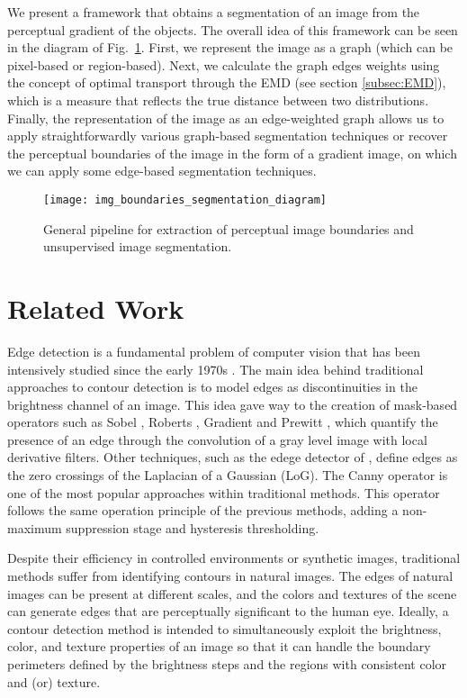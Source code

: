 We present a framework that obtains a segmentation of an image from the perceptual gradient of the objects. The overall idea of this framework can be seen in the diagram of Fig.\ \ref{fig:pipeline_gabor_image_segmentation}. First, we represent the image as a graph (which can be pixel-based or region-based). Next, we calculate the graph edges weights using the concept of optimal transport through the EMD (see section \ref{subsec:EMD}), which is a measure that reflects the true distance between two distributions. Finally, the representation of the image as an edge-weighted graph allows us to apply straightforwardly various graph-based segmentation techniques or recover the perceptual boundaries of the image in the form of a gradient image, on which we can apply some edge-based segmentation techniques. 

\begin{figure}[!ht]
	\centering
	\texttt{[image: img\_boundaries\_segmentation\_diagram]}
	\caption{General pipeline for extraction of perceptual image boundaries and unsupervised image segmentation.}\label{fig:pipeline_gabor_image_segmentation}
\end{figure}

\section{Related Work}\label{sec:soa_boundaries_segmentation} \label{sec:SoA_segmentation_methods}
Edge detection is a fundamental problem of computer vision that has been intensively studied since the early 1970s \citep{Hueckel:JACM:1971, Fram.Deutsch:TC:1975}. The main idea behind traditional approaches to contour detection is to model edges as discontinuities in the brightness channel of an image. This idea gave way to the creation of mask-based operators such as Sobel \citep{Sobel.Feldman:SAIL:1990}, Roberts \citep{Roberts:Thesis:1963}, Gradient \citep{Maitre:Book:2003} and Prewitt \citep{Prewitt:PPP:1970}, which quantify the presence of an edge through the convolution of a gray level image with local derivative filters. Other techniques, such as the edege detector of  \cite{Marr.Hildreth:PRS:1980}, define edges as the zero crossings of the Laplacian of a Gaussian (LoG). The Canny operator \citep{Canny:PAMI:1986} is one of the most popular approaches within traditional methods. This operator follows the same operation principle of the previous methods, adding a non-maximum suppression stage and hysteresis thresholding. 

Despite their efficiency in controlled environments or synthetic images, traditional methods suffer from identifying contours in natural images. The edges of natural images can be present at different scales, and the colors and textures of the scene can generate edges that are perceptually significant to the human eye. Ideally, a contour detection method is intended to simultaneously exploit the brightness, color, and texture properties of an image so that it can handle the boundary perimeters defined by the brightness steps and the regions with consistent color and (or) texture.

